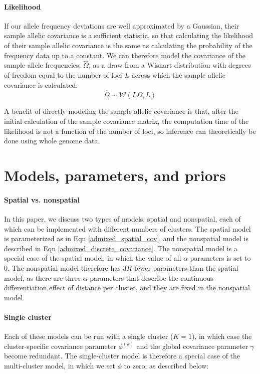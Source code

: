 \documentclass[12pt]{article}
\begin{document}
\paragraph{Likelihood}
If our allele frequency deviations are well approximated by a Gaussian, 
their sample allelic covariance is a sufficient statistic,
so that calculating the likelihood of their sample allelic covariance is the same as 
calculating the probability of the frequency data up to a constant. 
We can therefore model the covariance of the sample allele frequencies, $\widehat{\Omega}$, 
as a draw from a Wishart distribution with degrees of freedom equal to 
the number of loci $L$ across which the sample allelic covariance is calculated:
\begin{equation}
\widehat{\Omega} \sim \mathcal{W}\left( L\Omega, L	\right)
\label{wishart}
\end{equation}

A benefit of directly modeling the sample allelic covariance is that, 
after the initial calculation of the sample covariance matrix,
the computation time of the likelihood is not a function of the number of loci,
so inference can theoretically be done using whole genome data.


\section{Models, parameters, and priors}\label{model_app}
\paragraph{Spatial vs. nonspatial}
In this paper, we discuss two types of models, spatial and nonspatial, 
each of which can be implemented with different numbers of clusters.
The spatial model is parameterized as in Eqn \eqref{admixed_spatial_cov},
and the nonspatial model is described in Eqn \eqref{admixed_discrete_covariance}.
The nonspatial model is a special case of the spatial model, 
in which the value of all $\alpha$ parameters is set to 0.
The nonspatial model therefore has $3K$ fewer parameters than the spatial model,
as there are three $\alpha$ parameters that describe the continuous differentiation effect of distance per cluster,
and they are fixed in the nonspatial model.

\paragraph{Single cluster}
Each of these models can be run with a single cluster ($K=1$), 
in which case the cluster-specific covariance parameter $\phi^{(k)}$ 
and the global covariance parameter $\gamma$ become redundant.
The single-cluster model is therefore a special case of the multi-cluster model, 
in which we set $\phi$ to zero, as described below:
\end{document}
